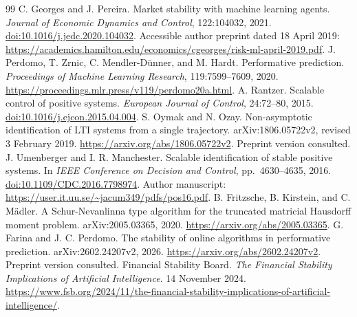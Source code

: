 \documentclass[11pt]{article}
\theoremstyle{remark}\newtheorem{remark}[theorem]{Remark}
\begin{document}
\begin{thebibliography}{99}
C. Georges and J. Pereira. Market stability with machine learning agents. \emph{Journal of Economic Dynamics and Control}, 122:104032, 2021. \href{https://doi.org/10.1016/j.jedc.2020.104032}{doi:10.1016/j.jedc.2020.104032}. Accessible author preprint dated 18 April 2019: \url{https://academics.hamilton.edu/economics/cgeorges/risk-ml-april-2019.pdf}.
J. Perdomo, T. Zrnic, C. Mendler-D\"unner, and M. Hardt. Performative prediction. \emph{Proceedings of Machine Learning Research}, 119:7599--7609, 2020. \url{https://proceedings.mlr.press/v119/perdomo20a.html}.
A. Rantzer. Scalable control of positive systems. \emph{European Journal of Control}, 24:72--80, 2015. \href{https://doi.org/10.1016/j.ejcon.2015.04.004}{doi:10.1016/j.ejcon.2015.04.004}.
S. Oymak and N. Ozay. Non-asymptotic identification of LTI systems from a single trajectory. arXiv:1806.05722v2, revised 3 February 2019. \url{https://arxiv.org/abs/1806.05722v2}. Preprint version consulted.
J. Umenberger and I. R. Manchester. Scalable identification of stable positive systems. In \emph{IEEE Conference on Decision and Control}, pp.\ 4630--4635, 2016. \href{https://doi.org/10.1109/CDC.2016.7798974}{doi:10.1109/CDC.2016.7798974}. Author manuscript: \url{https://user.it.uu.se/~jacum349/pdfs/pos16.pdf}.
B. Fritzsche, B. Kirstein, and C. M\"adler. A Schur-Nevanlinna type algorithm for the truncated matricial Hausdorff moment problem. arXiv:2005.03365, 2020. \url{https://arxiv.org/abs/2005.03365}.
G. Farina and J. C. Perdomo. The stability of online algorithms in performative prediction. arXiv:2602.24207v2, 2026. \url{https://arxiv.org/abs/2602.24207v2}. Preprint version consulted.
Financial Stability Board. \emph{The Financial Stability Implications of Artificial Intelligence}. 14 November 2024. \url{https://www.fsb.org/2024/11/the-financial-stability-implications-of-artificial-intelligence/}.
\end{thebibliography}
\end{document}

